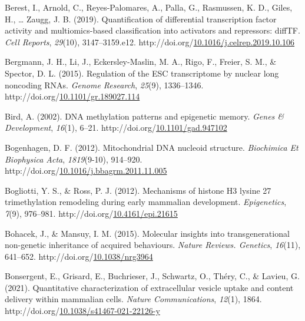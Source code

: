 \documentclass[12pt,twoside]{reedthesis}
\newlength{\cslhangindent}
\newenvironment{CSLReferences}[2] %
 {%
  \setlength{\parindent}{0pt}
  \ifodd #1 \everypar{\setlength{\hangindent}{\cslhangindent}}\ignorespaces\fi
  \ifnum #2 > 0
  \setlength{\parskip}{#2\baselineskip}
  \fi
 }%
 {}
\begin{document}
\begin{CSLReferences}{1}{0}
\leavevmode{}%
Berest, I., Arnold, C., Reyes-Palomares, A., Palla, G., Rasmussen, K. D., Giles, H., \ldots{} Zaugg, J. B. (2019). Quantification of differential transcription factor activity and multiomics-based classification into activators and repressors: diffTF. \emph{Cell Reports}, \emph{29}(10), 3147--3159.e12. http://doi.org/\href{https://doi.org/10.1016/j.celrep.2019.10.106}{10.1016/j.celrep.2019.10.106}

\leavevmode{}%
Bergmann, J. H., Li, J., Eckersley-Maslin, M. A., Rigo, F., Freier, S. M., \& Spector, D. L. (2015). Regulation of the ESC transcriptome by nuclear long noncoding RNAs. \emph{Genome Research}, \emph{25}(9), 1336--1346. http://doi.org/\href{https://doi.org/10.1101/gr.189027.114}{10.1101/gr.189027.114}

\leavevmode{}%
Bird, A. (2002). DNA methylation patterns and epigenetic memory. \emph{Genes \& Development}, \emph{16}(1), 6--21. http://doi.org/\href{https://doi.org/10.1101/gad.947102}{10.1101/gad.947102}

\leavevmode{}%
Bogenhagen, D. F. (2012). Mitochondrial DNA nucleoid structure. \emph{Biochimica Et Biophysica Acta}, \emph{1819}(9-10), 914--920. http://doi.org/\href{https://doi.org/10.1016/j.bbagrm.2011.11.005}{10.1016/j.bbagrm.2011.11.005}

\leavevmode{}%
Bogliotti, Y. S., \& Ross, P. J. (2012). Mechanisms of histone H3 lysine 27 trimethylation remodeling during early mammalian development. \emph{Epigenetics}, \emph{7}(9), 976--981. http://doi.org/\href{https://doi.org/10.4161/epi.21615}{10.4161/epi.21615}

\leavevmode{}%
Bohacek, J., \& Mansuy, I. M. (2015). Molecular insights into transgenerational non-genetic inheritance of acquired behaviours. \emph{Nature Reviews. Genetics}, \emph{16}(11), 641--652. http://doi.org/\href{https://doi.org/10.1038/nrg3964}{10.1038/nrg3964}

\leavevmode{}%
Bonsergent, E., Grisard, E., Buchrieser, J., Schwartz, O., Théry, C., \& Lavieu, G. (2021). Quantitative characterization of extracellular vesicle uptake and content delivery within mammalian cells. \emph{Nature Communications}, \emph{12}(1), 1864. http://doi.org/\href{https://doi.org/10.1038/s41467-021-22126-y}{10.1038/s41467-021-22126-y}


\end{CSLReferences}
\end{document}
